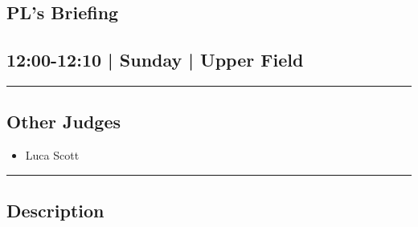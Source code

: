 \documentclass[10pt, A5]{article}
\begin{document}
		\begin{framed}
			\begin{minipage}{\textwidth}

			\setcounter{section}{112}
							\section{PL's Briefing}
						
			\subsection*{12:00-12:10 | Sunday | Upper Field}

			\vspace{0.25cm}
			\hrule
			\vspace{0.25cm}


			\subsection*{Other Judges}
							

				\begin{multicols}{2}

			\begin{itemize}
											\item Luca Scott
								\end{itemize}

			\vfill\null
			\columnbreak

			\begin{itemize}
								\end{itemize}

			\vfill\null

			\end{multicols}

			\vspace{0.25cm}
			\hrule
			\vspace{0.25cm}

			\begin{minipage}{\textwidth}
			\subsection*{\faListAlt \: Description}
			
			\end{minipage}


	\end{minipage}
	\end{framed}

	
\end{document}
